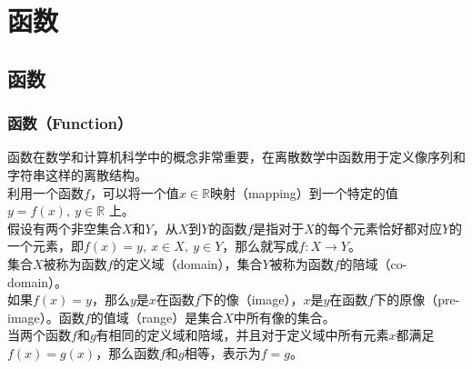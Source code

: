 \chapter{函数}

\section{函数}

\subsection{函数（Function）}

函数在数学和计算机科学中的概念非常重要，在离散数学中函数用于定义像序列和字符串这样的离散结构。\\

利用一个函数$ f $，可以将一个值$ x \in \mathbb{R} $映射（mapping）到一个特定的值$ y = f(x),\ y \in \mathbb{R} $ 上。\\

假设有两个非空集合$ X $和$ Y $，从$ X $到$ Y $的函数$ f $是指对于$ X $的每个元素恰好都对应$ Y $的一个元素，即$ f(x) = y,\ x \in X,\ y \in Y $，那么就写成$ f: X \rightarrow Y $。\\

集合$ X $被称为函数$ f $的定义域（domain），集合$ Y $被称为函数$ f $的陪域（co-domain）。\\

如果$ f(x) = y $，那么$ y $是$ x $在函数$ f $下的像（image），$ x $是$ y $在函数$ f $下的原像（pre-image）。函数$ f $的值域（range）是集合$ X $中所有像的集合。\\

当两个函数$ f $和$ g $有相同的定义域和陪域，并且对于定义域中所有元素$ x $都满足$ f(x) = g(x) $，那么函数$ f $和$ g $相等，表示为$ f = g $。

